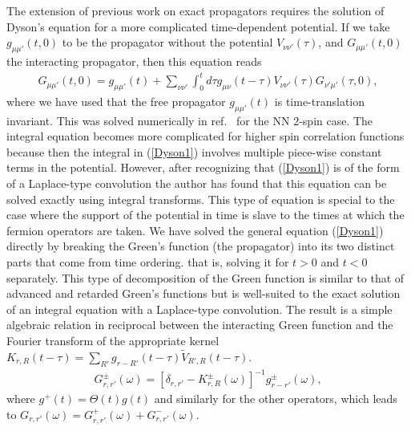 \documentclass[aps,pra,preprint,groupedaddress]{revtex4-1}
\newcommand{\1}{\mathds{1}}
\begin{document}
The extension of previous work on exact propagators \cite{Knolle} requires the solution of Dyson's equation for a more complicated time-dependent potential. If we take $g_{\mu \mu'}(t,0)$ to be the propagator without the potential $V_{\nu \nu'}(\tau)$, and $G_{\mu \mu'}(t,0)$ the interacting propagator, then this equation reads
\begin{align}\label{Dyson1}
G_{\mu \mu'}(t,0) = g_{\mu \mu'}(t) + \sum_{\nu \nu'} \int_0^t d \tau g_{\mu \nu}(t-\tau) V_{\nu \nu'}(\tau) G_{\nu' \mu'}(\tau,0), 
\end{align}
where we have used that the free propagator $ g_{\mu \mu'}(t) $ is time-translation invariant. %
This was solved numerically in ref.~ for the NN $2$-spin case. The integral equation becomes more complicated for higher spin correlation functions because then the integral in (\ref{Dyson1}) involves multiple piece-wise constant terms in the potential. However, after recognizing that (\ref{Dyson1}) is of the form of a Laplace-type convolution the author has found that this equation can be solved exactly using integral transforms. This type of equation is special to the case where the support of the potential in time is slave to the times at which the fermion operators are taken. We have solved the general equation (\ref{Dyson1}) directly by breaking the Green's function (the propagator) into its two distinct parts that come from time ordering. that is, solving it for $t>0$ and $t<0$ separately. This type of decomposition of the Green function is similar to that of advanced and retarded Green's functions \cite{A&G,Zubarev} but is well-suited to the exact solution of an integral equation with a Laplace-type convolution. The result is a simple algebraic relation in reciprocal between the interacting Green function and the Fourier transform of the appropriate kernel $K_{r,R}(t-\tau) = \sum_{R'} g_{r-R'}(t-\tau) \tilde{V}_{R',R}(t-\tau) $.
\begin{align}\label{soln1}
G^{\pm}_{r,r'}(\omega) = \left[\delta_{r,r'} - K^\pm_{r,R}(\omega) \right]^{-1} g^\pm_{r-r'}(\omega),
\end{align}
where $g^+(t) = \Theta(t) g(t)$ and similarly for the other operators, which leads to $G_{r,r'}(\omega) = G^{+}_{r,r'}(\omega) + G^{-}_{r,r'}(\omega) $.
\end{document}
